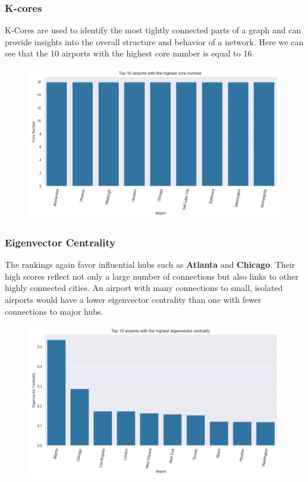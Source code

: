 \documentclass[12pt]{article}
\begin{document}
\subsubsection{K-cores}
K-Cores are used to identify the most tightly connected parts of a graph and can provide insights into the overall structure and behavior of a network. Here we can see that the 10 airports with the highest core number is equal to 16.

\begin{figure}[H]
    \centering
    \includegraphics[width=0.8\linewidth]{img/core_number.png}
\end{figure}

\subsubsection{Eigenvector Centrality}
The rankings again favor influential hubs such as \textbf{Atlanta} and \textbf{Chicago}. Their high scores reflect not only a large number of connections but also links to other highly connected cities. An airport with many connections to small, isolated airports would have a lower eigenvector centrality than one with fewer connections to major hubs.

\begin{figure}[H]
    \centering
    \includegraphics[width=0.8\linewidth]{img/eigenvector_centrality.png}
\end{figure}
\end{document}
